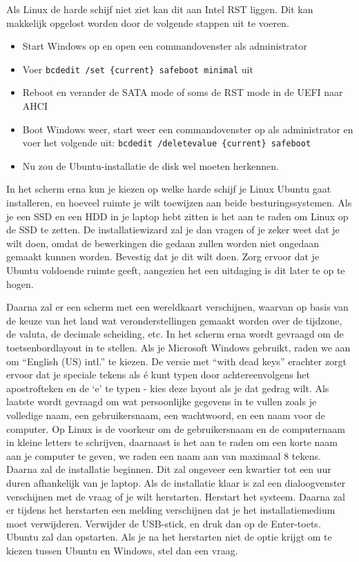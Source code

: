 \documentclass[10pt,a4paper]{article}
\begin{document}
Als Linux de harde schijf niet ziet kan dit aan Intel RST liggen. Dit kan makkelijk opgelost worden
door de volgende stappen uit te voeren.
\begin{itemize}
     \item Start Windows op en open een commandovenster als administrator
     \item Voer \verb|bcdedit /set {current} safeboot minimal| uit
     \item Reboot en verander de SATA mode of soms de RST mode in de UEFI naar AHCI
     \item Boot Windows weer, start weer een commandovenster op als administrator en voer het volgende uit: \verb|bcdedit /deletevalue {current} safeboot|
     \item Nu zou de Ubuntu-installatie de disk wel moeten herkennen.
\end{itemize}
In het scherm erna kun je kiezen op welke harde schijf je
Linux Ubuntu gaat installeren, en hoeveel ruimte je wilt toewijzen aan beide besturingssystemen. Als je een SSD en een HDD in je laptop hebt zitten is het aan te raden om Linux op de SSD te zetten.
De installatiewizard zal je dan vragen of je zeker weet dat je wilt doen, omdat de bewerkingen die gedaan zullen worden niet ongedaan gemaakt kunnen worden.
Bevestig dat je dit wilt doen. Zorg ervoor dat je Ubuntu voldoende ruimte geeft, aangezien het een uitdaging is dit later te op te hogen.

Daarna zal er een scherm met een wereldkaart verschijnen, waarvan op basis van de keuze
van het land wat veronderstellingen gemaakt worden over de tijdzone,
de valuta, de decimale scheiding, etc.
In het scherm erna wordt gevraagd om de toetsenbordlayout in te stellen.
Als je Microsoft Windows gebruikt, raden we aan om ``English (US) intl.'' te kiezen. De versie met ``with dead keys'' erachter zorgt ervoor dat je speciale tekens als \'e kunt typen door achtereenvolgens het apostrofteken en de `e' te typen - kies deze layout als je dat gedrag wilt.
Als laatste wordt gevraagd om wat persoonlijke gegevens in te vullen zoals je volledige naam,
een gebruikersnaam, een wachtwoord, en een naam voor de computer.
Op Linux is de voorkeur om de gebruikersnaam en de computernaam in kleine letters te schrijven,
daarnaast is het aan te raden om een korte naam aan je computer te geven,
we raden een naam aan van maximaal
8 tekens.
Daarna zal de installatie beginnen.
Dit zal ongeveer een kwartier tot een uur duren afhankelijk van je laptop.
Als de installatie klaar is zal een dialoogvenster verschijnen met de vraag of je wilt herstarten.
Herstart het systeem.
Daarna zal er tijdens het herstarten een melding verschijnen dat je het installatiemedium moet
verwijderen.
Verwijder de USB-stick, en druk dan op de Enter-toets. Ubuntu zal dan opstarten.
Als je na het herstarten niet de optie krijgt om te kiezen tussen Ubuntu en Windows, stel dan een vraag.
\end{document}
